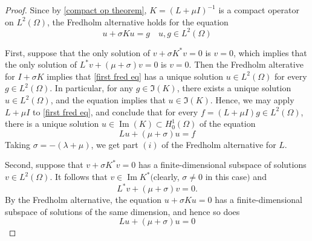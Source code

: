 \documentclass[11pt]{article}
\begin{document}
            \begin{proof}
                Since by \autoref{compact op theorem}, \(K=(L+\mu I)^{-1}\) is a compact operator on \(L^{2}(\Omega)\), the Fredholm
                alternative holds for the equation
                \begin{equation}\label{first fred eq}
                    u+\sigma K u=g \quad u, g \in L^{2}(\Omega)
                \end{equation}
                
                First, suppose that the only solution of \(v+\sigma K^{*} v=0\) is \(v=0\), which implies
                that the only solution of \(L^{*} v+(\mu+\sigma) v=0\) is \(v=0 .\) Then the Fredholm alterative
                for \(I+\sigma K\) implies that \eqref{first fred eq} has a unique solution \(u \in L^{2}(\Omega)\) for every \(g \in L^{2}(\Omega) .\)
                In particular, for any \(g \in\Im(K)\), there exists a unique solution \(u \in L^{2}(\Omega)\), and
                the equation implies that $u \in \Im (K).$ Hence, we may apply \(L+\mu I\) to \eqref{first fred eq},
                and conclude that for every \(f=(L+\mu I) g \in L^{2}(\Omega)\), there is a unique solution
                \(u \in \operatorname{Im} (K) \subset H_{0}^{1}(\Omega)\) of the equation
                \begin{equation}\label{fred eq 2}
                 L u+(\mu+\sigma) u=f   
                \end{equation}
                Taking \(\sigma=-(\lambda+\mu)\), we get part \((i)\) of the Fredholm alternative for \(L .\)
                
                Second, suppose that \(v+\sigma K^{*} v=0\) has a finite-dimensional subspace of solutions \(v \in L^{2}(\Omega) .\) It follows that \(v \in \operatorname{Im} K^{*}(\)clearly, \(\sigma \neq 0\) in this case\()\) and
                $$
                L^{*} v+(\mu+\sigma) v=0.
                $$
                By the Fredholm alternative, the equation \(u+\sigma K u=0\) has a finite-dimensional
                subspace of solutions of the same dimension, and hence so does
                \begin{equation*}
                 L u+(\mu+\sigma) u=0   
                \end{equation*}
                

\end{proof}
\end{document}

